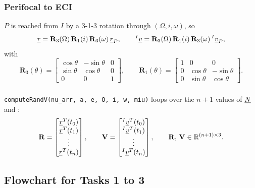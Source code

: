 \subsubsection*{Perifocal to ECI}
$P$ is reached from $I$ by a 3-1-3 rotation through $(\Omega, i, \omega)$, so
\begin{equation}
\underline{r} = \mathbf{R}_3(\Omega)\,\mathbf{R}_1(i)\,\mathbf{R}_3(\omega)\,\underline{r}_P,
\qquad
{}^{I}\underline{v} = \mathbf{R}_3(\Omega)\,\mathbf{R}_1(i)\,\mathbf{R}_3(\omega)\,{}^{I}\underline{v}_P,
\label{eq:t1-rot}
\end{equation}
with
\begin{equation}
\mathbf{R}_3(\theta) = \begin{bmatrix} \cos\theta & -\sin\theta & 0 \\ \sin\theta & \cos\theta & 0 \\ 0 & 0 & 1 \end{bmatrix},
\qquad
\mathbf{R}_1(\theta) = \begin{bmatrix} 1 & 0 & 0 \\ 0 & \cos\theta & -\sin\theta \\ 0 & \sin\theta & \cos\theta \end{bmatrix}.
\end{equation}

\subsubsection*{}
\texttt{computeRandV(nu\_arr, a, e, O, i, w, miu)} loops over the $n+1$ values of $\underline{N}$ and :
\begin{equation}
\mathbf{R} = \begin{bmatrix} \underline{r}^T(t_0) \\ \underline{r}^T(t_1) \\ \vdots \\ \underline{r}^T(t_n) \end{bmatrix},
\qquad
\mathbf{V} = \begin{bmatrix} {}^{I}\underline{v}^T(t_0) \\ {}^{I}\underline{v}^T(t_1) \\ \vdots \\ {}^{I}\underline{v}^T(t_n) \end{bmatrix},
\qquad
\mathbf{R},\,\mathbf{V} \in \mathbb{R}^{(n+1)\times 3}.
\end{equation}

\subsection*{Flowchart for Tasks 1 to 3}

